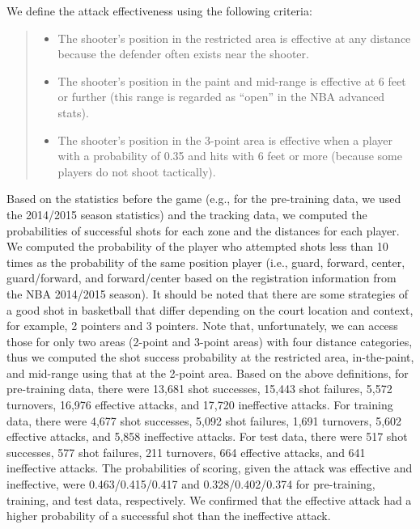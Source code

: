 We define the attack effectiveness using the following criteria:
\vspace{-0pt}
\begin{quote}
\begin{itemize}
\item The shooter's position in the restricted area is effective at any distance because the defender often exists near the shooter.
\item The shooter's position in the paint and mid-range is effective at 6 feet or further (this range is regarded as ``open'' in the NBA advanced stats).
\item The shooter's position in the 3-point area is effective when a player with a probability of 0.35 and hits with 6 feet or more (because some players do not shoot tactically).
\end{itemize}
\end{quote}
\vspace{-0pt}
Based on the statistics before the game (e.g., for the pre-training data, we used the 2014/2015 season statistics) and the tracking data, 
we computed the probabilities of successful shots for each zone and the distances for each player. 
We computed the probability of the player who attempted shots less than 10 times as the probability of the same position player (i.e., guard, forward, center, guard/forward, and forward/center based on the registration information from the NBA 2014/2015 season).
It should be noted that there are some strategies of a good shot in basketball that differ depending on the court location and context, for example, 2 pointers and 3 pointers.
Note that, unfortunately, we can access those for only two areas (2-point and 3-point areas) with four distance categories, thus we computed the shot success probability at the restricted area, in-the-paint, and mid-range using that at the 2-point area.
%
Based on the above definitions, for pre-training data, there were 13,681 shot successes, 15,443 shot failures, 5,572 turnovers,
16,976 effective attacks, and 17,720 ineffective attacks.
For training data, there were 4,677 shot successes, 5,092 shot failures, 1,691 turnovers, 5,602 effective attacks, and 5,858 ineffective attacks.
For test data, there were 517 shot successes, 577 shot failures, 211 turnovers, 664 effective attacks, and 641 ineffective attacks.
The probabilities of scoring, given the attack was effective and ineffective, were 0.463/0.415/0.417 and 0.328/0.402/0.374 for pre-training, training, and test data, respectively.
We confirmed that the effective attack had a higher probability of a successful shot than the ineffective attack. 

